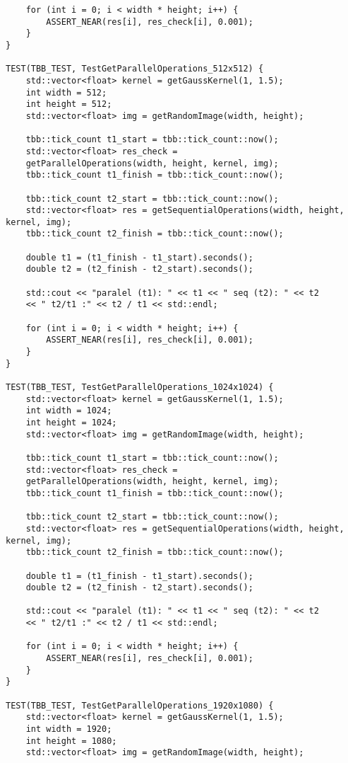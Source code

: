 \documentclass{report}
\begin{document}
\begin{lstlisting}
	for (int i = 0; i < width * height; i++) {
		ASSERT_NEAR(res[i], res_check[i], 0.001);
	}
}

TEST(TBB_TEST, TestGetParallelOperations_512x512) {
	std::vector<float> kernel = getGaussKernel(1, 1.5);
	int width = 512;
	int height = 512;
	std::vector<float> img = getRandomImage(width, height);
	
	tbb::tick_count t1_start = tbb::tick_count::now();
	std::vector<float> res_check =
	getParallelOperations(width, height, kernel, img);
	tbb::tick_count t1_finish = tbb::tick_count::now();
	
	tbb::tick_count t2_start = tbb::tick_count::now();
	std::vector<float> res = getSequentialOperations(width, height, kernel, img);
	tbb::tick_count t2_finish = tbb::tick_count::now();
	
	double t1 = (t1_finish - t1_start).seconds();
	double t2 = (t2_finish - t2_start).seconds();
	
	std::cout << "paralel (t1): " << t1 << " seq (t2): " << t2
	<< " t2/t1 :" << t2 / t1 << std::endl;
	
	for (int i = 0; i < width * height; i++) {
		ASSERT_NEAR(res[i], res_check[i], 0.001);
	}
}

TEST(TBB_TEST, TestGetParallelOperations_1024x1024) {
	std::vector<float> kernel = getGaussKernel(1, 1.5);
	int width = 1024;
	int height = 1024;
	std::vector<float> img = getRandomImage(width, height);
	
	tbb::tick_count t1_start = tbb::tick_count::now();
	std::vector<float> res_check =
	getParallelOperations(width, height, kernel, img);
	tbb::tick_count t1_finish = tbb::tick_count::now();
	
	tbb::tick_count t2_start = tbb::tick_count::now();
	std::vector<float> res = getSequentialOperations(width, height, kernel, img);
	tbb::tick_count t2_finish = tbb::tick_count::now();
	
	double t1 = (t1_finish - t1_start).seconds();
	double t2 = (t2_finish - t2_start).seconds();
	
	std::cout << "paralel (t1): " << t1 << " seq (t2): " << t2
	<< " t2/t1 :" << t2 / t1 << std::endl;
	
	for (int i = 0; i < width * height; i++) {
		ASSERT_NEAR(res[i], res_check[i], 0.001);
	}
}

TEST(TBB_TEST, TestGetParallelOperations_1920x1080) {
	std::vector<float> kernel = getGaussKernel(1, 1.5);
	int width = 1920;
	int height = 1080;
	std::vector<float> img = getRandomImage(width, height);
	

\end{lstlisting}
\end{document}
